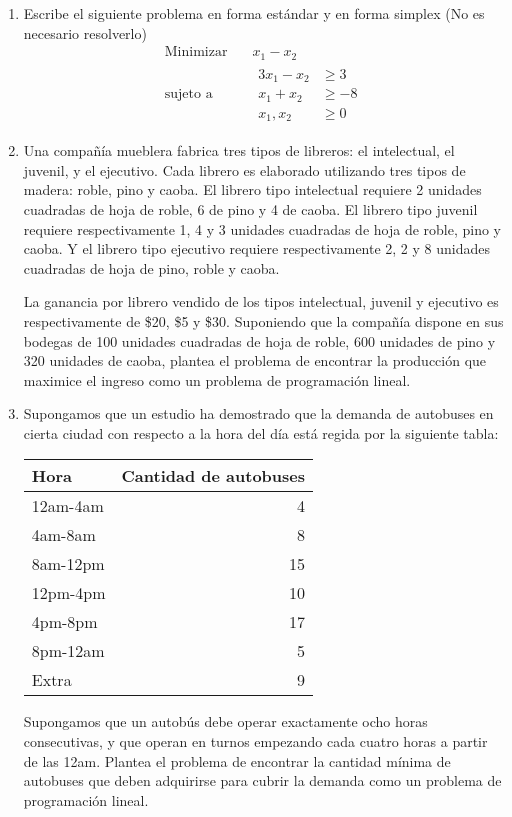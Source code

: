 \documentclass[twocolumn]{article}
\begin{document}
\begin{enumerate}
\item Escribe el siguiente problema en forma estándar y en forma simplex
(No es necesario resolverlo)
\begin{equation*}
\begin{aligned}
\text{Minimizar} \quad & x_{1}-x_{2}\\
\text{sujeto a} \quad &
  \begin{aligned}
   3x_{1}-x_{2} & \geq 3\\
   x_{1}+x_{2} &\geq -8\\
   x_{1},x_{2} &\geq 0
  \end{aligned}
\end{aligned}
\end{equation*}

\item Una compañía mueblera fabrica tres tipos de libreros: el
\guillemotleft{}intelectual\guillemotright{}, el \guillemotleft{}juvenil\guillemotright{}, y el \guillemotleft{}ejecutivo\guillemotright{}. Cada librero es
elaborado utilizando tres tipos de madera: roble, pino y caoba. El
librero tipo \guillemotleft{}intelectual\guillemotright{} requiere 2 unidades cuadradas de hoja de
roble, 6 de pino y 4 de caoba. El librero tipo \guillemotleft{}juvenil\guillemotright{} requiere
respectivamente 1, 4 y 3 unidades cuadradas de hoja de roble, pino
y caoba. Y el librero tipo \guillemotleft{}ejecutivo\guillemotright{} requiere respectivamente 2,
2 y 8 unidades cuadradas de hoja de pino, roble y caoba.

La ganancia por librero vendido de los tipos \guillemotleft{}intelectual\guillemotright{},
\guillemotleft{}juvenil\guillemotright{} y \guillemotleft{}ejecutivo\guillemotright{} es respectivamente de \$20, \$5 y
\$30. Suponiendo que la compañía dispone en sus bodegas de 100
unidades cuadradas de hoja de roble, 600 unidades de pino y 320
unidades de caoba, plantea el problema de encontrar la producción
que maximice el ingreso como un problema de programación lineal.

\item Supongamos que un estudio ha demostrado que la demanda de autobuses
en cierta ciudad con respecto a la hora del día está regida por la
siguiente tabla:
\begin{center}
\begin{tabular}{lr}
Hora & Cantidad de autobuses\\
\hline
12am-4am & 4\\
4am-8am & 8\\
8am-12pm & 15\\
12pm-4pm & 10\\
4pm-8pm & 17\\
8pm-12am & 5\\
Extra & 9\\
\end{tabular}
\end{center}
Supongamos que un autobús debe operar exactamente ocho horas
consecutivas, y que operan en turnos empezando cada cuatro horas a
partir de las 12am. Plantea el problema de encontrar la cantidad
mínima de autobuses que deben adquirirse para cubrir la
demanda como un problema de programación lineal.
\end{enumerate}
\end{document}
